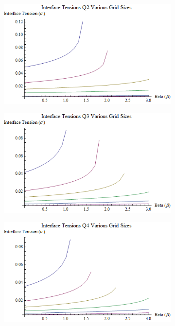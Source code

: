 \begin{figure}[H]
\centering
\begin{subfigure}[b]{0.45\textwidth}
    \includegraphics[width=\textwidth]{4-Results/Q2VariousGridSizesTensions.png}

\end{subfigure}
\begin{subfigure}[b]{0.45\textwidth}
    \includegraphics[width=\textwidth]{4-Results/Q3VariousGridSizesTensions.png}

\end{subfigure}

\begin{subfigure}[b]{0.45\textwidth}
   \includegraphics[width=\textwidth]{4-Results/Q4VariousGridSizesTensions.png}


\end{subfigure}
\end{figure}

